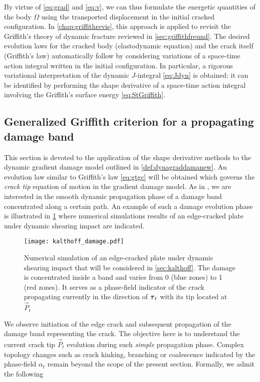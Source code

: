 By virtue of \eqref{eq:grad} and \eqref{eq:v}, we can thus formulate the energetic quantities of the body $\Omega$ using the transported displacement in the initial cracked configuration. In \cref{chap:griffithrevis}, this approach is applied to revisit the Griffith's theory of dynamic fracture reviewed in \cref{sec:griffithfreund}. The desired evolution laws for the cracked body (elastodynamic equation) and the crack itself (Griffith's law) automatically follow by considering variations of a space-time action integral written in the initial configuration. In particular, a rigorous variational interpretation of the dynamic $J$-integral \eqref{eq:Jdyn} is obtained: it can be identified by performing the shape derivative of a space-time action integral involving the Griffith's surface energy \eqref{eq:StGriffith}.

\subsection{Generalized Griffith criterion for a propagating damage band}
This section is devoted to the application of the shape derivative methods to the dynamic gradient damage model outlined in \cref{def:dynagraddamanew}. An evolution law similar to Griffith's law \eqref{eq:gtgc} will be obtained which governs the \emph{crack tip} equation of motion in the gradient damage model. As in \cite{SicsicMarigo:2013}, we are interested in the smooth dynamic propagation phase of a damage band concentrated along a certain path. An example of such a damage evolution phase is illustrated in \cref{fig:kalthoffF} where numerical simulations results of an edge-cracked plate under dynamic shearing impact are indicated.
\begin{figure}[htbp]
\centering
\texttt{[image: kalthoff\_damage.pdf]}
\caption{Numerical simulation of an edge-cracked plate under dynamic shearing impact that will be considered in \cref{sec:kalthoff}. The damage is concentrated inside a band and varies from 0 (blue zones) to 1 (red zones). It serves as a phase-field indicator of the crack propagating currently in the direction of $\vtau_t$ with its tip located at $\vec{P}_t$} \label{fig:kalthoffF}
\end{figure}
We observe initiation of the edge crack and subsequent propagation of the damage band representing the crack. The objective here is to understand the current crack tip $\vec{P}_t$ evolution during such \emph{simple} propagation phase. Complex topology changes such as crack kinking, branching or coalescence indicated by the phase-field $\alpha_t$ remain beyond the scope of the present section. Formally, we admit the following
